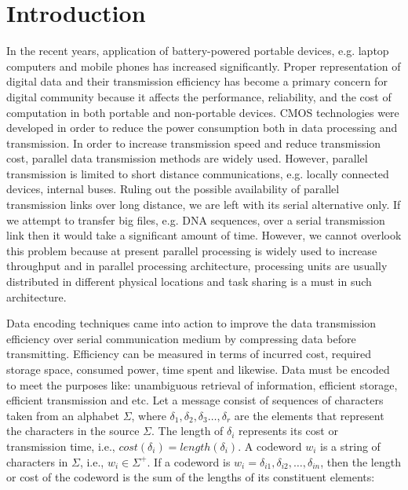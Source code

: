 \documentclass{singlecol-new}
\theoremstyle{TH}{
\newtheorem{lemma}{Lemma}
\newtheorem{theorem}[lemma]{Theorem}
\newtheorem{corrolary}[lemma]{Corrolary}
\newtheorem{conjecture}[lemma]{Conjecture}
\newtheorem{proposition}[lemma]{Proposition}
\newtheorem{claim}[lemma]{Claim}
\newtheorem{stheorem}[lemma]{Wrong Theorem}
}
\theoremstyle{THrm}{
\newtheorem{definition}{Definition}
\newtheorem{question}{Question}
\newtheorem{remark}{Remark}
\newtheorem{scheme}{Scheme}
}
\theoremstyle{THhit}{
\newtheorem{case}{Case}[section]
}
\def\tc{\textcolor{red}}
\begin{document}


\maketitle

\section{Introduction}
\label{sec-introduction}
In the recent years, application of battery-powered portable devices, e.g. laptop computers and mobile phones has increased significantly. Proper representation of digital data and their transmission efficiency has become a primary concern for digital community because it affects the performance, reliability, and the cost of computation in both portable and non-portable devices. CMOS technologies were developed in order to reduce the power consumption both in data processing and transmission. In order to increase transmission speed and reduce transmission cost, parallel data transmission methods are widely used. However, parallel transmission is limited to short distance communications, e.g. locally connected devices, internal buses. Ruling out the possible availability of parallel transmission links over long distance, we are left with its serial alternative only. If we attempt to transfer big files, e.g. DNA sequences, over a serial transmission link then it would take a significant amount of time. However, we cannot overlook this problem because at present parallel processing is widely used to increase throughput and in parallel processing architecture, processing units are usually distributed in different physical locations and task sharing is a must in such architecture.    

Data encoding techniques came into action to improve the data transmission efficiency over serial communication medium by compressing data before transmitting. Efficiency can be measured in terms of incurred cost, required storage space, consumed power, time spent and likewise. Data must be encoded to meet the purposes like: unambiguous retrieval of information, efficient storage, efficient transmission and etc. Let a message consist of sequences of characters taken from an alphabet $\Sigma$, where  $\delta_1,\delta_2,\delta_3\ldots,\delta_r$ are the elements that represent the characters in the source $\Sigma$. The length of $\delta_i$ represents its cost or transmission time, i.e., $cost\left(\delta_i\right)= length(\delta_i)$. A codeword $w_i$ is a string of characters in $\Sigma$, i.e., $w_i\in\Sigma^{+}$. If a codeword is $w_i=\delta_{i1},\delta_{i2},\ldots,\delta_{in}$, then the length or cost of the codeword is the sum of the lengths of its constituent elements:
\end{document}
